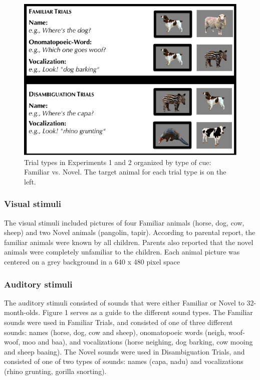 \documentclass[english,floatsintext,man]{apa6}
\theoremstyle{definition}
\theoremstyle{definition}
\theoremstyle{definition}
\theoremstyle{remark}
\begin{document}
\begin{figure}[tb]

{\centering \includegraphics[width=0.8\linewidth]{anime_manuscript_files/figure-latex/stimuli-e1-1} 

}

\caption{Trial types in Experiments 1 and 2 organized by type of cue: Familiar vs. Novel. The target animal for each trial type is on the left.}\label{fig:stimuli-e1}
\end{figure}

\hypertarget{visual-stimuli}{%
\subsubsection{Visual stimuli}\label{visual-stimuli}}

The visual stimuli included pictures of four Familiar animals (horse,
dog, cow, sheep) and two Novel animals (pangolin, tapir). According to
parental report, the familiar animals were known by all children.
Parents also reported that the novel animals were completely unfamiliar
to the children. Each animal picture was centered on a grey background
in a 640 x 480 pixel space

\hypertarget{auditory-stimuli}{%
\subsubsection{Auditory stimuli}\label{auditory-stimuli}}

The auditory stimuli consisted of sounds that were either Familiar or
Novel to 32-month-olds. Figure 1 serves as a guide to the different
sound types. The Familiar sounds were used in Familiar Trials, and
consisted of one of three different sounds: names (horse, dog, cow and
sheep), onomatopoeic words (neigh, woof-woof, moo and baa), and
vocalizations (horse neighing, dog barking, cow mooing and sheep
baaing). The Novel sounds were used in Disambiguation Trials, and
consisted of one of two types of sounds: names (capa, nadu) and
vocalizations (rhino grunting, gorilla snorting).
\end{document}
